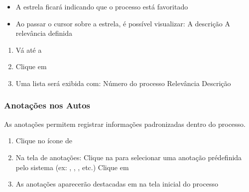 \documentclass[letterpaper,10pt,brazil]{sphinxmanual}
\begin{document}
\sphinxAtStartPar
{}
\begin{itemize}
\item {} 
\sphinxAtStartPar
A estrela ficará  indicando que o processo está favoritado

\item {} 
\sphinxAtStartPar
Ao passar o cursor sobre a estrela, é possível visualizar:
\sphinxhyphen{} A descrição
\sphinxhyphen{} A relevância definida

\end{itemize}

\sphinxAtStartPar
{}
\begin{enumerate}
%
\item {} 
\sphinxAtStartPar
Vá até a 

\item {} 
\sphinxAtStartPar
Clique em 

\item {} 
\sphinxAtStartPar
Uma lista será exibida com:
\sphinxhyphen{} Número do processo
\sphinxhyphen{} Relevância
\sphinxhyphen{} Descrição

\end{enumerate}


\subsubsection{Anotações nos Autos}
\label{\detokenize{projud_12_favoritar:anotacoes-nos-autos}}
\sphinxAtStartPar
As anotações permitem registrar informações padronizadas dentro do processo.

\sphinxAtStartPar
{}
\begin{enumerate}
%
\item {} 
\sphinxAtStartPar
Clique no ícone de 

\item {} 
\sphinxAtStartPar
Na tela de anotações:
\sphinxhyphen{} Clique na  para selecionar uma anotação pré\sphinxhyphen{}definida pelo sistema (ex: , , , etc.)
\sphinxhyphen{} Clique em 

\item {} 
\sphinxAtStartPar
As anotações aparecerão destacadas em  na tela inicial do processo

\end{enumerate}
\end{document}

